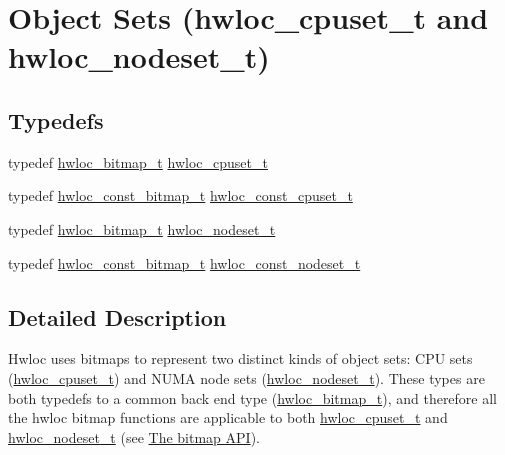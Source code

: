 \hypertarget{a00183}{}\section{Object Sets (hwloc\+\_\+cpuset\+\_\+t and hwloc\+\_\+nodeset\+\_\+t)}
\label{a00183}
\subsection*{Typedefs}
\begin{DoxyCompactItemize}
\item 
typedef \hyperlink{a00205_gaa3c2bf4c776d603dcebbb61b0c923d84}{hwloc\+\_\+bitmap\+\_\+t} \hyperlink{a00183_ga4bbf39b68b6f568fb92739e7c0ea7801}{hwloc\+\_\+cpuset\+\_\+t}
\item 
typedef \hyperlink{a00205_gae991a108af01d408be2776c5b2c467b2}{hwloc\+\_\+const\+\_\+bitmap\+\_\+t} \hyperlink{a00183_ga1f784433e9b606261f62d1134f6a3b25}{hwloc\+\_\+const\+\_\+cpuset\+\_\+t}
\item 
typedef \hyperlink{a00205_gaa3c2bf4c776d603dcebbb61b0c923d84}{hwloc\+\_\+bitmap\+\_\+t} \hyperlink{a00183_ga37e35730fa7e775b5bb0afe893d6d508}{hwloc\+\_\+nodeset\+\_\+t}
\item 
typedef \hyperlink{a00205_gae991a108af01d408be2776c5b2c467b2}{hwloc\+\_\+const\+\_\+bitmap\+\_\+t} \hyperlink{a00183_ga2f5276235841ad66a79bedad16a5a10c}{hwloc\+\_\+const\+\_\+nodeset\+\_\+t}
\end{DoxyCompactItemize}


\subsection{Detailed Description}
Hwloc uses bitmaps to represent two distinct kinds of object sets\+: C\+PU sets (\hyperlink{a00183_ga4bbf39b68b6f568fb92739e7c0ea7801}{hwloc\+\_\+cpuset\+\_\+t}) and N\+U\+MA node sets (\hyperlink{a00183_ga37e35730fa7e775b5bb0afe893d6d508}{hwloc\+\_\+nodeset\+\_\+t}). These types are both typedefs to a common back end type (\hyperlink{a00205_gaa3c2bf4c776d603dcebbb61b0c923d84}{hwloc\+\_\+bitmap\+\_\+t}), and therefore all the hwloc bitmap functions are applicable to both \hyperlink{a00183_ga4bbf39b68b6f568fb92739e7c0ea7801}{hwloc\+\_\+cpuset\+\_\+t} and \hyperlink{a00183_ga37e35730fa7e775b5bb0afe893d6d508}{hwloc\+\_\+nodeset\+\_\+t} (see \hyperlink{a00205}{The bitmap A\+PI}).

